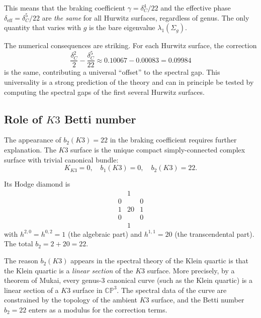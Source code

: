 \documentclass[12pt,a4paper]{article}
\theoremstyle{definition}
\theoremstyle{remark}
\newcommand{\CC}{\mathbb{C}}
\newcommand{\PP}{\mathbb{P}}
\begin{document}
This means that the braking coefficient $\gamma = \delta_C^4/22$ and the effective phase $\delta_{\mathrm{eff}} = \delta_C^5/22$ are \emph{the same} for all Hurwitz surfaces, regardless of genus. The only quantity that varies with $g$ is the bare eigenvalue $\lambda_1(\Sigma_g)$.

The numerical consequences are striking. For each Hurwitz surface, the correction
\begin{equation}
\frac{\delta_C^2}{2} - \frac{\delta_C^5}{22} \approx 0.10067 - 0.00083 = 0.09984
\end{equation}
is the same, contributing a universal ``offset'' to the spectral gap. This universality is a strong prediction of the theory and can in principle be tested by computing the spectral gaps of the first several Hurwitz surfaces.

\subsection{Role of $K3$ Betti number}

The appearance of $b_2(K3) = 22$ in the braking coefficient requires further explanation. The $K3$ surface is the unique compact simply-connected complex surface with trivial canonical bundle:
\begin{equation}
K_{K3} = 0, \quad b_1(K3) = 0, \quad b_2(K3) = 22.
\end{equation}

Its Hodge diamond is
\begin{equation}
\begin{array}{ccc}
& 1 & \\
0 & & 0 \\
1 & 20 & 1 \\
0 & & 0 \\
& 1 &
\end{array}
\end{equation}
with $h^{2,0} = h^{0,2} = 1$ (the algebraic part) and $h^{1,1} = 20$ (the transcendental part). The total $b_2 = 2 + 20 = 22$.

The reason $b_2(K3)$ appears in the spectral theory of the Klein quartic is that the Klein quartic is a \emph{linear section} of the $K3$ surface. More precisely, by a theorem of Mukai, every genus-$3$ canonical curve (such as the Klein quartic) is a linear section of a $K3$ surface in $\CC\PP^3$. The spectral data of the curve are constrained by the topology of the ambient $K3$ surface, and the Betti number $b_2 = 22$ enters as a modulus for the correction terms.
\end{document}
